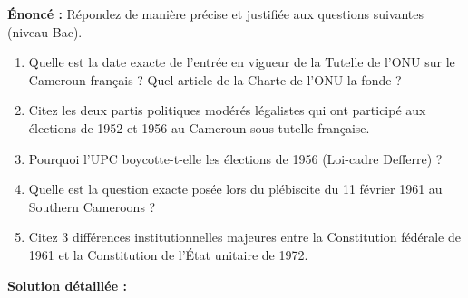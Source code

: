 \documentclass[11pt]{article}
\begin{document}
\begin{exoresolu}
\textbf{Énoncé :} Répondez de manière précise et justifiée aux questions suivantes (niveau Bac).
\begin{enumerate}
    \item Quelle est la date exacte de l'entrée en vigueur de la Tutelle de l'ONU sur le Cameroun français ? Quel article de la Charte de l'ONU la fonde ?
    \item Citez les deux partis politiques modérés légalistes qui ont participé aux élections de 1952 et 1956 au Cameroun sous tutelle française.
    \item Pourquoi l'UPC boycotte-t-elle les élections de 1956 (Loi-cadre Defferre) ?
    \item Quelle est la question exacte posée lors du plébiscite du 11 février 1961 au Southern Cameroons ?
    \item Citez 3 différences institutionnelles majeures entre la Constitution fédérale de 1961 et la Constitution de l'État unitaire de 1972.
\end{enumerate}

\tcblower
\textbf{Solution détaillée :}


\end{exoresolu}
\end{document}
